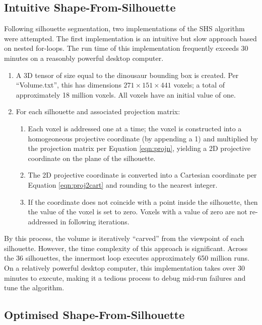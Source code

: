 \subsection{Intuitive Shape-From-Silhouette}

Following silhouette segmentation, two implementations of the SHS algorithm were attempted. The first implementation is an intuitive but slow approach based on nested for-loops. The run time of this implementation frequently exceeds 30 minutes on a reasonbly powerful desktop computer.

\begin{enumerate}
  \item A 3D tensor of size equal to the dinousaur bounding box is created. Per ``Volume.txt'', this has dimensions $271\times151\times441$ voxels; a total of approximately 18 million voxels. All voxels have an initial value of one.

  \item For each silhouette and associated projection matrix:
  \begin{enumerate}
    \item Each voxel is addressed one at a time; the voxel is constructed into a homogeoneous projective coordinate (by appending a 1) and multiplied by the projection matrix per Equation \ref{eqn:projn}, yielding a 2D projective coordinate on the plane of the silhouette.

    \item The 2D projective coordinate is converted into a Cartesian coordinate per Equation \ref{eqn:proj2cart} and rounding to the nearest integer.

    \item If the coordinate does not coincide with a point inside the silhouette, then the value of the voxel is set to zero. Voxels with a value of zero are not re-addressed in following iterations.

  \end{enumerate}
\end{enumerate}

By this process, the volume is iteratively ``carved'' from the viewpoint of each silhouette. However, the time complexity of this approach is significant. Across the 36 silhouettes, the innermost loop executes approximately 650 million runs. On a relatively powerful desktop computer, this implementation takes over 30 minutes to execute, making it a tedious process to debug mid-run failures and tune the algorithm.

\subsection{Optimised Shape-From-Silhouette}

